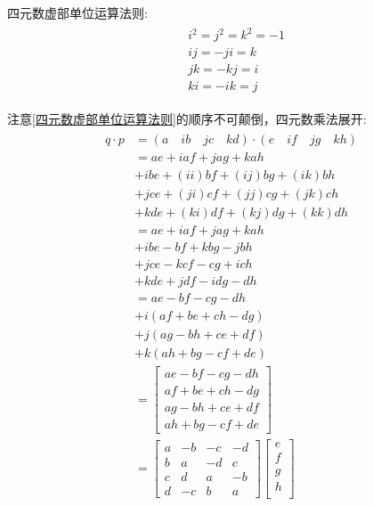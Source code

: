\documentclass[12pt,a4paper]{article}
\begin{document}
四元数虚部单位运算法则:
\begin{eqnarray}\label{四元数虚部单位运算法则}
    \begin{split}
        &i^2=j^2=k^2=-1 \\
        &ij=-ji=k \\
        &jk=-kj=i \\
        &ki=-ik=j
    \end{split}
\end{eqnarray} 

注意\ref{四元数虚部单位运算法则}的顺序不可颠倒，四元数乘法展开:
\begin{eqnarray}\label{四元数乘法展开}
    \begin{split}
        q\cdot p
        &=(a\quad ib\quad jc\quad kd)\cdot(e\quad if\quad jg\quad kh) \\
        &= ae+   iaf+   jag+   kah \\
        &+ibe+(ii)bf+(ij)bg+(ik)bh \\
        &+jce+(ji)cf+(jj)cg+(jk)ch \\
        &+kde+(ki)df+(kj)dg+(kk)dh \\
        &= ae+iaf+jag+kah \\
        &+ibe- bf+kbg-jbh \\
        &+jce-kcf- cg+ich \\
        &+kde+jdf-idg- dh \\
        &=  ae-bf-cg-dh \\
        &+i(af+be+ch-dg) \\
        &+j(ag-bh+ce+df) \\
        &+k(ah+bg-cf+de) \\
        &=\left[\begin{matrix}
        ae-bf-cg-dh \\
        af+be+ch-dg \\
        ag-bh+ce+df \\
        ah+bg-cf+de
        \end{matrix}\right] \\
        &=\left[\begin{matrix}
        a &-b &-c &-d \\
        b & a &-d & c \\
        c & d & a &-b \\
        d &-c & b & a
        \end{matrix}\right]
        \left[\begin{matrix}
                e \\
                f \\
                g \\
                h \\
        \end{matrix}\right]
    \end{split}
\end{eqnarray} 
\end{document}
